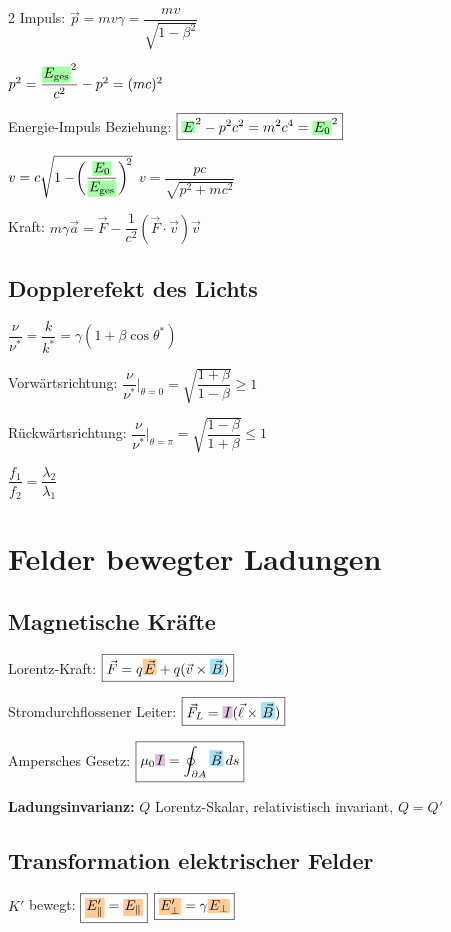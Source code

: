 \documentclass[10pt,a4paper]{article}
\newcommand{\bhbox}[1]{%
  \par\vspace{2pt}\noindent%
  \colorbox{blue!12}{\parbox{\dimexpr\linewidth-2\fboxsep\relax}{\small#1}}%
  \par\vspace{2pt}}
\newcommand{\ec}[1]{{\setlength\fboxsep{1pt}\colorbox{green!35}{\ensuremath{#1}}}}
\newcommand{\icc}[1]{{\setlength\fboxsep{1pt}\colorbox{violet!25}{\ensuremath{#1}}}}
\newcommand{\efc}[1]{{\setlength\fboxsep{1pt}\colorbox{orange!40}{\ensuremath{#1}}}}
\newcommand{\bfc}[1]{{\setlength\fboxsep{1pt}\colorbox{cyan!35}{\ensuremath{#1}}}}
\begin{document}
\begin{multicols}{2}
Impuls: $\boxed{\vec{p}=mv\gamma=\dfrac{mv}{\sqrt{1-\beta^2}}}$

$p^2=\dfrac{\ec{E_{\text{ges}}}^2}{c^2}-p^2=(mc)^2$

Energie-Impuls Beziehung: $\boxed{\ec{E}^2-p^2c^2=m^2c^4=\ec{E_0}^2}$

$v=c\sqrt{1-\!\left(\dfrac{\ec{E_0}}{\ec{E_{\text{ges}}}}\right)^{\!2}}$ \quad $v=\dfrac{pc}{\sqrt{p^2+mc^2}}$

Kraft: $m\gamma\vec{a}=\vec{F}-\dfrac{1}{c^2}(\vec{F}\cdot\vec{v})\vec{v}$

\subsection{Dopplerefekt des Lichts}

$\dfrac{\nu}{\nu^*}=\dfrac{k}{k^*}=\gamma(1+\beta\cos\theta^*)$

Vorwärtsrichtung: $\boxed{\dfrac{\nu}{\nu^*}\bigg|_{\theta=0}=\sqrt{\dfrac{1+\beta}{1-\beta}}\geq1}$

Rückwärtsrichtung: $\boxed{\dfrac{\nu}{\nu^*}\bigg|_{\theta=\pi}=\sqrt{\dfrac{1-\beta}{1+\beta}}\leq1}$

$\dfrac{f_1}{f_2}=\dfrac{\lambda_2}{\lambda_1}$

\section{Felder bewegter Ladungen}

\subsection{Magnetische Kräfte}

Lorentz-Kraft: $\boxed{\vec{F}=q\efc{\vec{E}}+q(\vec{v}\times\bfc{\vec{B}})}$

Stromdurchflossener Leiter: $\boxed{\vec{F}_L=\icc{I}(\vec{\ell}\times\bfc{\vec{B}})}$

Ampersches Gesetz: $\boxed{\mu_0 \icc{I}=\oint_{\partial A}\bfc{\vec{B}}\,ds}$

\bhbox{\textbf{Ladungsinvarianz:} $Q$ Lorentz-Skalar, relativistisch invariant, $Q=Q'$}

\subsection{Transformation elektrischer Felder}

$K'$ bewegt: $\boxed{\efc{E'_\parallel}=\efc{E_\parallel}}$ \quad $\boxed{\efc{E'_\perp}=\gamma \efc{E_\perp}}$


\end{multicols}
\end{document}
